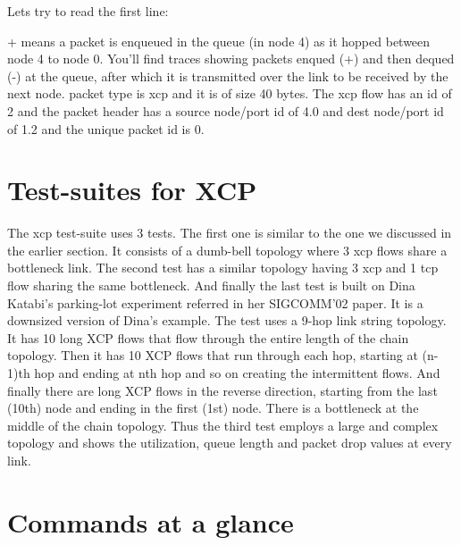   Lets try to read the first line:

  
  + means a packet is enqueued in the queue (in node 4) as it hopped
  between node 4 to node 0. You'll find traces showing packets enqued
  (+) and then dequed (-) at the queue, after which it is transmitted
  over the link to be received by the next node. packet
  type is xcp and it is of size 40 bytes. The xcp flow has an id of 2
  and the packet header has a source node/port id of 4.0 and dest
  node/port id of 1.2 and the unique packet id is 0.
    
  \section{Test-suites for XCP}
  \label{sec:test for xcp}
  
  The xcp test-suite uses 3 tests. The first one is similar to the one
  we discussed in the earlier section. It consists of a dumb-bell
  topology where 3 xcp flows share a bottleneck link. The second test
  has a similar topology having 3 xcp and 1 tcp flow sharing the same
  bottleneck. And finally the last test is built on Dina Katabi's
  parking-lot experiment referred in her SIGCOMM'02 paper. It is a
  downsized version of Dina's example. The test uses a 9-hop
  link string topology. It has 10 long XCP flows that flow through the
  entire length of the chain topology. Then it has 10 XCP flows that run
  through each hop, starting at (n-1)th hop and ending at nth hop and so
  on creating the intermittent flows. And finally there are long XCP
  flows in the reverse direction, 
  starting from the last (10th) node and ending in the first (1st) node.
  There is a bottleneck at the middle of the chain topology. Thus the
  third test employs a large and complex topology and shows the
  utilization, queue length and packet drop values at every link.
  

  \section{Commands at a glance}
  \label{sec:commands-xcp}
  
